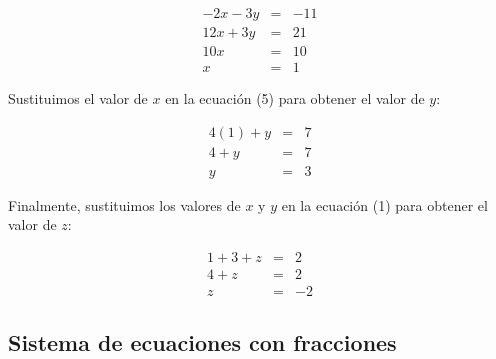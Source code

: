 \documentclass[12pt,addpoints,answers]{repaso}
\begin{document}
\begin{questions}
{\begin{solutionbox}{18cm}
            \begin{eqnarray}
                -2x-3y&=&-11 \nonumber\\
                12x+3y&=&21 \nonumber\\ \hline
                10x&=&10 \nonumber\\
                x&=&1 \nonumber
            \end{eqnarray}
            
            Sustituimos el valor de $x$ en la ecuación (5) para obtener el valor de $y$:

            \begin{eqnarray}
                4(1)+y&=&7 \nonumber\\
                4+y&=&7 \nonumber\\
                y&=&3 \nonumber
            \end{eqnarray}

            Finalmente, sustituimos los valores de $x$ y $y$ en la ecuación (1) para obtener el valor de $z$:

            \begin{eqnarray}
                1+3+z&=&2 \nonumber\\
                4+z&=&2 \nonumber\\
                z&=&-2 \nonumber
            \end{eqnarray}
        \end{solutionbox}
    }

    \subsection{Sistema de ecuaciones con fracciones}
  
\end{questions}
\end{document}
